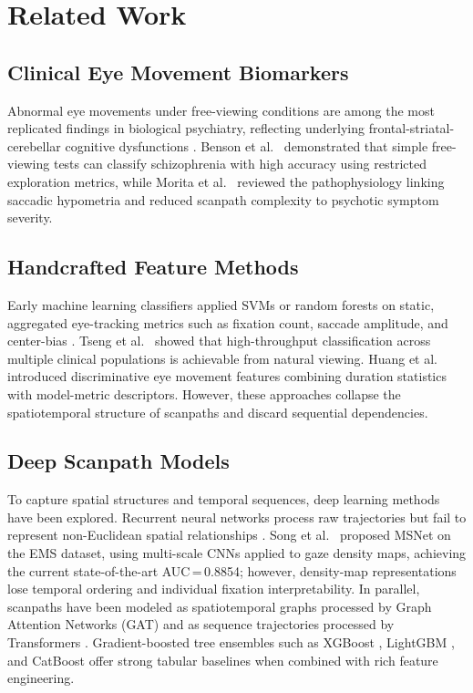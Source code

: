 \section{Related Work}
\label{sec:related_work}

\subsection{Clinical Eye Movement Biomarkers}
Abnormal eye movements under free-viewing conditions are among the most replicated findings in biological psychiatry, reflecting underlying frontal-striatal-cerebellar cognitive dysfunctions \cite{holzman1973}. Benson et al.\ \cite{benson2012} demonstrated that simple free-viewing tests can classify schizophrenia with high accuracy using restricted exploration metrics, while Morita et al.\ \cite{morita2020} reviewed the pathophysiology linking saccadic hypometria and reduced scanpath complexity to psychotic symptom severity.

\subsection{Handcrafted Feature Methods}
Early machine learning classifiers applied SVMs or random forests on static, aggregated eye-tracking metrics such as fixation count, saccade amplitude, and center-bias \cite{shpigelman2008}. Tseng et al.\ \cite{tseng2013} showed that high-throughput classification across multiple clinical populations is achievable from natural viewing. Huang et al.\ \cite{huang2020} introduced discriminative eye movement features combining duration statistics with model-metric descriptors. However, these approaches collapse the spatiotemporal structure of scanpaths and discard sequential dependencies.

\subsection{Deep Scanpath Models}
To capture spatial structures and temporal sequences, deep learning methods have been explored. Recurrent neural networks process raw trajectories but fail to represent non-Euclidean spatial relationships \cite{kasprowski2020}. Song et al.\ \cite{song2025} proposed MSNet on the EMS dataset, using multi-scale CNNs applied to gaze density maps, achieving the current state-of-the-art AUC\,=\,0.8854; however, density-map representations lose temporal ordering and individual fixation interpretability. In parallel, scanpaths have been modeled as spatiotemporal graphs processed by Graph Attention Networks (GAT) \cite{velickovic2018, birawo2024} and as sequence trajectories processed by Transformers \cite{vaswani2017}. Gradient-boosted tree ensembles such as XGBoost \cite{chen2016xgboost}, LightGBM \cite{ke2017lightgbm}, and CatBoost \cite{prokhorenkova2018catboost} offer strong tabular baselines when combined with rich feature engineering.

